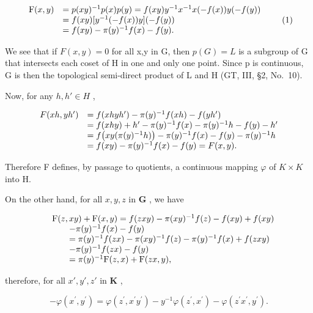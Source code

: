 \[
\begin{array}{r l} \mathrm{F} (x, y) & = p (x y) ^ {- 1} p (x) p (y) = f (x y) y ^ {- 1} x ^ {- 1} x (- f (x)) y (- f (y)) \\ & = f (x y) [ y ^ {- 1} (- f (x)) y ] (- f (y)) \\ & = f (x y) - \pi (y) ^ {- 1} f (x) - f (y). \end{array}\tag{1}
\]

We see that if \(F(x,y) = 0\) for all x,y in G, then \(p(G) = L\) is a subgroup of G that intersects each coset of H in one and only one point. Since p is continuous, G is then the topological semi-direct product of L and H (GT, III, §2, No.~10).

Now, for any \(h, h' \in H\) ,

\[
\begin{array}{r l} F (x h, y h ^ {\prime}) & = f (x h y h ^ {\prime}) - \pi (y) ^ {- 1} f (x h) - f (y h ^ {\prime}) \\ & = f (x h y) + h ^ {\prime} - \pi (y) ^ {- 1} f (x) - \pi (y) ^ {- 1} h - f (y) - h ^ {\prime} \\ & = f \big (x y (\pi (y) ^ {- 1} h) \big) - \pi (y) ^ {- 1} f (x) - f (y) - \pi (y) ^ {- 1} h \\ & = f (x y) - \pi (y) ^ {- 1} f (x) - f (y) = F (x, y). \end{array}
\]

Therefore F defines, by passage to quotients, a continuous mapping \(\varphi\) of \(K \times K\) into H.

On the other hand, for all \(x, y, z\) in \(\mathbf{G}\) , we have

\[
\begin{array}{r l} & {\mathrm{F} (z, x y) + \mathrm{F} (x, y) = f (z x y) - \pi (x y) ^ {- 1} f (z) - f (x y) + f (x y)} \\ & {\qquad - \pi (y) ^ {- 1} f (x) - f (y)} \\ & {\qquad = \pi (y) ^ {- 1} f (z x) - \pi (x y) ^ {- 1} f (z) - \pi (y) ^ {- 1} f (x) + f (z x y)} \\ & {\qquad - \pi (y) ^ {- 1} f (z x) - f (y)} \\ & {\qquad = \pi (y) ^ {- 1} \mathrm{F} (z, x) + \mathrm{F} (z x, y),} \end{array}
\]

therefore, for all \(x', y', z'\) in \(\mathbf{K}\) ,

\[
- \varphi (x ^ {\prime}, y ^ {\prime}) = \varphi (z ^ {\prime}, x ^ {\prime} y ^ {\prime}) - y ^ {- 1} \varphi (z ^ {\prime}, x ^ {\prime}) - \varphi (z ^ {\prime} x ^ {\prime}, y ^ {\prime}).
\]

